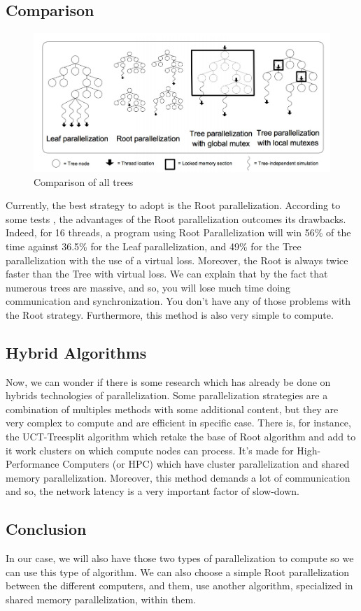 \subsection{Comparison}
\begin{figure}[!h] 
\centerline{\includegraphics[scale=0.60]{2_State_of_the_art/Strategy_of_root_parallelization_Mikail/impara.png}}
   \caption{\label{étiquette} Comparison of all trees}
\label{comp_algo}
\end{figure}

Currently, the best strategy to adopt is the Root parallelization. According to some tests \cite{parallel_comp}\cite{tree_root_comp}, the advantages of the Root parallelization outcomes its drawbacks. Indeed, for 16 threads, a program using Root Parallelization will win 56\% of the time against 36.5\% for the Leaf parallelization, and 49\% for the Tree parallelization with the use of a virtual loss. Moreover, the Root is always twice faster than the Tree with virtual loss. We can explain that by the fact that numerous trees are massive, and so, you will lose much time doing communication and synchronization. You don’t have any of those problems with the Root strategy. Furthermore, this method is also very simple to compute.

\subsection{Hybrid Algorithms}

Now, we can wonder if there is some research which has already be done on hybrids technologies of parallelization. Some parallelization strategies are a combination of multiples methods with some additional content, but they are very complex to compute and are efficient in specific case.  There is, for instance, the UCT-Treesplit algorithm which retake the base of Root algorithm and add to it work clusters on which compute nodes can process. It’s made for High-Performance Computers (or HPC) which have cluster parallelization and shared memory parallelization. Moreover, this method demands a lot of communication and so, the network latency is a very important factor of slow-down. 

\subsection{Conclusion}

In our case, we will also have those two types of parallelization to compute so we can use this type of algorithm. We can also choose a simple Root parallelization between the different computers, and them, use another algorithm, specialized in shared memory parallelization, within them. 
